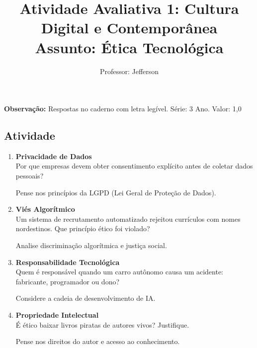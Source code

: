 \documentclass[11pt]{article}
\title{\textcolor{titleblue}{Atividade Avaliativa 1: Cultura Digital e Contemporânea \\Assunto: Ética Tecnológica}}
\author{Professor: Jefferson}
\date{}
\begin{document}
\maketitle
\vspace{-1cm}

\begin{center}
    \large{\textbf{Observação:} Respostas no caderno com letra legível. \quad Série: 3 Ano. Valor: 1,0}
\end{center}

\begin{multicols}{2}

\section*{Atividade}
\begin{enumerate}

\item \textbf{Privacidade de Dados}\\
Por que empresas devem obter consentimento explícito antes de coletar dados pessoais?
\begin{tcolorbox}[colback=explanationbg,colframe=titleblue,title=Dica:]
Pense nos princípios da LGPD (Lei Geral de Proteção de Dados).
\end{tcolorbox}

\item \textbf{Viés Algorítmico}\\
Um sistema de recrutamento automatizado rejeitou currículos com nomes nordestinos. Que princípio ético foi violado?
\begin{tcolorbox}[colback=explanationbg,colframe=titleblue,title=Dica:]
Analise discriminação algorítmica e justiça social.
\end{tcolorbox}

\item \textbf{Responsabilidade Tecnológica}\\
Quem é responsável quando um carro autônomo causa um acidente: fabricante, programador ou dono?
\begin{tcolorbox}[colback=explanationbg,colframe=titleblue,title=Dica:]
Considere a cadeia de desenvolvimento de IA.
\end{tcolorbox}

\item \textbf{Propriedade Intelectual}\\
É ético baixar livros piratas de autores vivos? Justifique.
\begin{tcolorbox}[colback=explanationbg,colframe=titleblue,title=Dica:]
Pense nos direitos do autor e acesso ao conhecimento.
\end{tcolorbox}


\end{enumerate}
\end{multicols}
\end{document}
